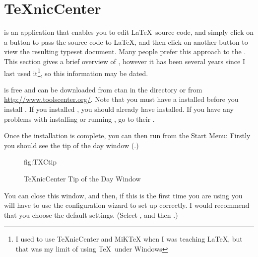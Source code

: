 
\section{TeXnicCenter}
\label{sec:TeXnicCenter}

 is an application that enables you to edit
\LaTeX\ source code, and simply click on a button to pass the source
code to \LaTeX, and then click on another button to view the
resulting typeset document.  Many people prefer this approach to the
. This section gives a brief overview of 
, however it has been several years since
I last used it\footnote{I used to use TeXnicCenter and
MiKTeX when I was teaching \LaTeX, but that was my limit of using
\TeX\ under Windows}, so this information may be dated.

 is free and can be downloaded from \gls{ctan} in the
directory or from \url{http://www.toolscenter.org/}.  Note that you
must have a  installed
before you install . If you installed
, you should
already have  installed. If you have any
problems with installing or running , go to
their .

Once the installation is complete, you can then run
 from the Start Menu:  Firstly you should see the tip of the day
window (.)

\begin{figure}[hbtp]
  {\caption{TeXnicCenter Tip of the Day Window}}
  {fig:TXCtip}
\end{figure}

You can close this window, and then, if this is the first time you
are using  you will have to use the
configuration wizard to set up  correctly.  I
would recommend that you choose the default settings. (Select
,  and then
.)

